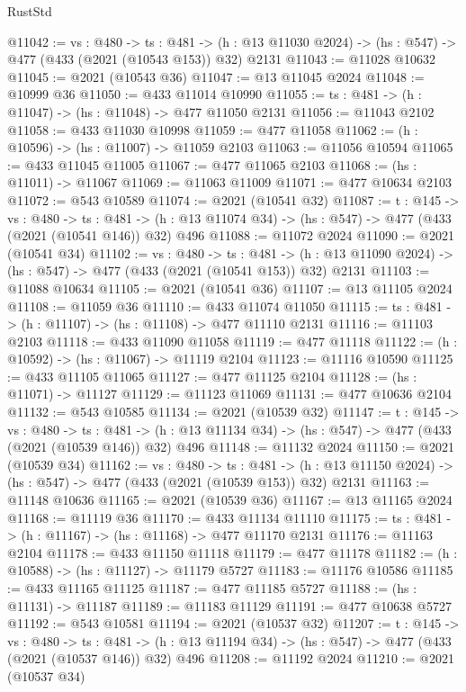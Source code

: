 \begin{lexlean}{RustStd}
\begin{coremodule}
@11042 := {vs : @480} ->
  {ts : @481} ->
  (h : @13 @11030 @2024) -> (hs : @547) -> @477 (@433 (@2021 (@10543 @153)) @32) @2131
@11043 := @11028 @10632
@11045 := @2021 (@10543 @36)
@11047 := @13 @11045 @2024
@11048 := @10999 @36
@11050 := @433 @11014 @10990
@11055 := {ts : @481} -> (h : @11047) -> (hs : @11048) -> @477 @11050 @2131
@11056 := @11043 @2102
@11058 := @433 @11030 @10998
@11059 := @477 @11058
@11062 := (h : @10596) -> (hs : @11007) -> @11059 @2103
@11063 := @11056 @10594
@11065 := @433 @11045 @11005
@11067 := @477 @11065 @2103
@11068 := (hs : @11011) -> @11067
@11069 := @11063 @11009
@11071 := @477 @10634 @2103
@11072 := @543 @10589
@11074 := @2021 (@10541 @32)
@11087 := {t : @145} ->
  {vs : @480} ->
  {ts : @481} -> (h : @13 @11074 @34) -> (hs : @547) -> @477 (@433 (@2021 (@10541 @146)) @32) @496
@11088 := @11072 @2024
@11090 := @2021 (@10541 @34)
@11102 := {vs : @480} ->
  {ts : @481} ->
  (h : @13 @11090 @2024) -> (hs : @547) -> @477 (@433 (@2021 (@10541 @153)) @32) @2131
@11103 := @11088 @10634
@11105 := @2021 (@10541 @36)
@11107 := @13 @11105 @2024
@11108 := @11059 @36
@11110 := @433 @11074 @11050
@11115 := {ts : @481} -> (h : @11107) -> (hs : @11108) -> @477 @11110 @2131
@11116 := @11103 @2103
@11118 := @433 @11090 @11058
@11119 := @477 @11118
@11122 := (h : @10592) -> (hs : @11067) -> @11119 @2104
@11123 := @11116 @10590
@11125 := @433 @11105 @11065
@11127 := @477 @11125 @2104
@11128 := (hs : @11071) -> @11127
@11129 := @11123 @11069
@11131 := @477 @10636 @2104
@11132 := @543 @10585
@11134 := @2021 (@10539 @32)
@11147 := {t : @145} ->
  {vs : @480} ->
  {ts : @481} -> (h : @13 @11134 @34) -> (hs : @547) -> @477 (@433 (@2021 (@10539 @146)) @32) @496
@11148 := @11132 @2024
@11150 := @2021 (@10539 @34)
@11162 := {vs : @480} ->
  {ts : @481} ->
  (h : @13 @11150 @2024) -> (hs : @547) -> @477 (@433 (@2021 (@10539 @153)) @32) @2131
@11163 := @11148 @10636
@11165 := @2021 (@10539 @36)
@11167 := @13 @11165 @2024
@11168 := @11119 @36
@11170 := @433 @11134 @11110
@11175 := {ts : @481} -> (h : @11167) -> (hs : @11168) -> @477 @11170 @2131
@11176 := @11163 @2104
@11178 := @433 @11150 @11118
@11179 := @477 @11178
@11182 := (h : @10588) -> (hs : @11127) -> @11179 @5727
@11183 := @11176 @10586
@11185 := @433 @11165 @11125
@11187 := @477 @11185 @5727
@11188 := (hs : @11131) -> @11187
@11189 := @11183 @11129
@11191 := @477 @10638 @5727
@11192 := @543 @10581
@11194 := @2021 (@10537 @32)
@11207 := {t : @145} ->
  {vs : @480} ->
  {ts : @481} -> (h : @13 @11194 @34) -> (hs : @547) -> @477 (@433 (@2021 (@10537 @146)) @32) @496
@11208 := @11192 @2024
@11210 := @2021 (@10537 @34)

\end{coremodule}
\end{lexlean}
